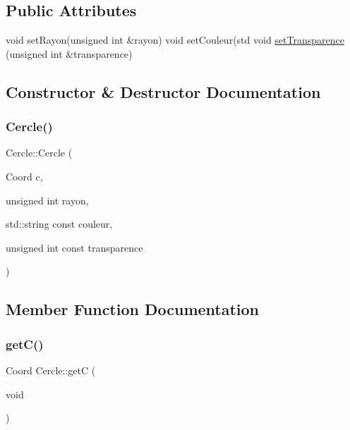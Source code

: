 \subsection*{Public Attributes}
\begin{DoxyCompactItemize}
\item 
void set\+Rayon(unsigned int \&rayon) void set\+Couleur(std void \hyperlink{class_cercle_a084cb5b26bfecd94eb4336e5b203c885}{set\+Transparence} (unsigned int \&transparence)
\end{DoxyCompactItemize}


\subsection{Constructor \& Destructor Documentation}
\mbox{\label{class_cercle_a91f80bb4ad0daa84b036d94f87dc9351}} 
\subsubsection{\texorpdfstring{Cercle()}{Cercle()}}
{\footnotesize\ttfamily Cercle\+::\+Cercle (\begin{DoxyParamCaption}\item[{Coord}]{c,  }\item[{unsigned int}]{rayon,  }\item[{std\+::string const}]{couleur,  }\item[{unsigned int const}]{transparence }\end{DoxyParamCaption})}



\subsection{Member Function Documentation}
\mbox{\label{class_cercle_a6f472f414ad785c4585d7b4139266d27}} 
\subsubsection{\texorpdfstring{get\+C()}{getC()}}
{\footnotesize\ttfamily Coord Cercle\+::getC (\begin{DoxyParamCaption}\item[{void}]{ }\end{DoxyParamCaption})}

